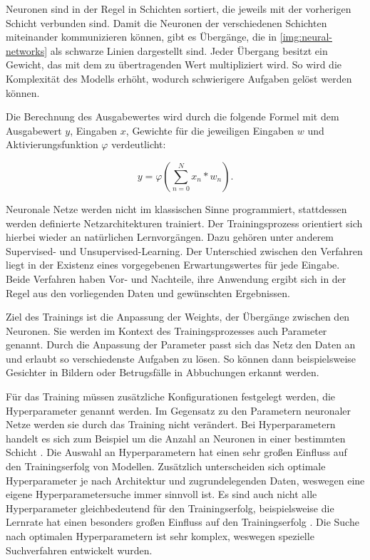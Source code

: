 Neuronen sind in der Regel in Schichten sortiert, die jeweils mit der vorherigen Schicht verbunden sind.
Damit die Neuronen der verschiedenen Schichten miteinander kommunizieren können, gibt es Übergänge, die in \cref{img:neural-networks} als schwarze Linien dargestellt sind.
Jeder Übergang besitzt ein Gewicht, das mit dem zu übertragenden Wert multipliziert wird.
So wird die Komplexität des Modells erhöht, wodurch schwierigere Aufgaben gelöst werden können.
\newline

Die Berechnung des Ausgabewertes wird durch die folgende Formel mit dem Ausgabewert $y$, Eingaben $x$, Gewichte für die jeweiligen Eingaben $w$ und Aktivierungsfunktion $\varphi$ verdeutlicht:

\begin{equation}
	y = \varphi ( \sum_{n=0}^N x_n * w_n).
\end{equation}


Neuronale Netze werden nicht im klassischen Sinne programmiert, stattdessen werden definierte Netzarchitekturen trainiert.
Der Trainingsprozess orientiert sich hierbei wieder an natürlichen Lernvorgängen.
Dazu gehören unter anderem Supervised- und Unsupervised-Learning.
Der Unterschied zwischen den Verfahren liegt in der Existenz eines vorgegebenen Erwartungswertes für jede Eingabe.
Beide Verfahren haben Vor- und Nachteile, ihre Anwendung ergibt sich in der Regel aus den vorliegenden Daten und gewünschten Ergebnissen.

Ziel des Trainings ist die Anpassung der Weights, der Übergänge zwischen den Neuronen.
Sie werden im Kontext des Trainingsprozesses auch Parameter genannt.
Durch die Anpassung der Parameter passt sich das Netz den Daten an und erlaubt so verschiedenste Aufgaben zu lösen.
So können dann beispielsweise Gesichter in Bildern oder Betrugsfälle in Abbuchungen erkannt werden.
\newline

Für das Training müssen zusätzliche Konfigurationen festgelegt werden, die Hyperparameter genannt werden.
Im Gegensatz zu den Parametern neuronaler Netze werden sie durch das Training nicht verändert.
Bei Hyperparametern handelt es sich zum Beispiel um die Anzahl an Neuronen in einer bestimmten Schicht \cite{hyperparameters-gan-using-genetic-algorithm}.
Die Auswahl an Hyperparametern hat einen sehr großen Einfluss auf den Trainingserfolg von Modellen.
Zusätzlich unterscheiden sich optimale Hyperparameter je nach Architektur und zugrundelegenden Daten, weswegen eine eigene Hyperparametersuche immer sinnvoll ist. 
Es sind auch nicht alle Hyperparameter gleichbedeutend für den Trainingserfolg, beispielsweise die Lernrate hat einen besonders großen Einfluss auf den Trainingserfolg \cite{learning-rate-most-important}.
Die Suche nach optimalen Hyperparametern ist sehr komplex, weswegen spezielle Suchverfahren entwickelt wurden. 

